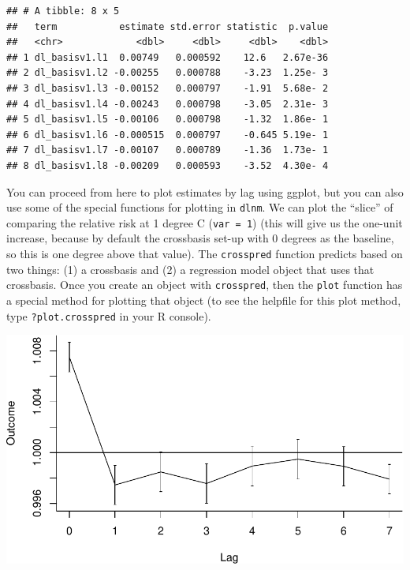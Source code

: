 \documentclass[
]{book}
\newenvironment{Shaded}{\begin{snugshade}}{\end{snugshade}}
\newcommand{\DataTypeTok}[1]{\textcolor[rgb]{0.13,0.29,0.53}{#1}}
\newcommand{\DecValTok}[1]{\textcolor[rgb]{0.00,0.00,0.81}{#1}}
\newcommand{\KeywordTok}[1]{\textcolor[rgb]{0.13,0.29,0.53}{\textbf{#1}}}
\newcommand{\NormalTok}[1]{#1}
\newcommand{\OperatorTok}[1]{\textcolor[rgb]{0.81,0.36,0.00}{\textbf{#1}}}
\newcommand{\StringTok}[1]{\textcolor[rgb]{0.31,0.60,0.02}{#1}}
\begin{document}
\begin{verbatim}
## # A tibble: 8 x 5
##   term           estimate std.error statistic  p.value
##   <chr>             <dbl>     <dbl>     <dbl>    <dbl>
## 1 dl_basisv1.l1  0.00749   0.000592    12.6   2.67e-36
## 2 dl_basisv1.l2 -0.00255   0.000788    -3.23  1.25e- 3
## 3 dl_basisv1.l3 -0.00152   0.000797    -1.91  5.68e- 2
## 4 dl_basisv1.l4 -0.00243   0.000798    -3.05  2.31e- 3
## 5 dl_basisv1.l5 -0.00106   0.000798    -1.32  1.86e- 1
## 6 dl_basisv1.l6 -0.000515  0.000797    -0.645 5.19e- 1
## 7 dl_basisv1.l7 -0.00107   0.000789    -1.36  1.73e- 1
## 8 dl_basisv1.l8 -0.00209   0.000593    -3.52  4.30e- 4
\end{verbatim}

You can proceed from here to plot estimates by lag using ggplot, but you can also use
some of the special functions for plotting in \texttt{dlnm}. We can plot the ``slice'' of comparing
the relative risk at 1 degree C (\texttt{var\ =\ 1}) (this will give us the one-unit increase,
because by default the crossbasis set-up with 0 degrees as the baseline, so this is
one degree above that value). The \texttt{crosspred} function predicts based on two things: (1)
a crossbasis and (2) a regression model object that uses that crossbasis. Once you create
an object with \texttt{crosspred}, then the \texttt{plot} function has a
special method for plotting that object (to see the helpfile for this
plot method, type \texttt{?plot.crosspred} in your R console).

\begin{Shaded}
\end{Shaded}

\includegraphics{adv_epi_analysis_files/figure-latex/unnamed-chunk-95-1.pdf}
\end{document}
